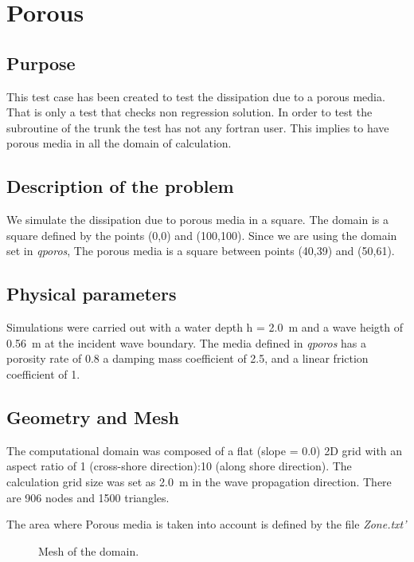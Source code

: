 \chapter{Porous}
%
%
\section{Purpose}
%
This test case has been created to test the dissipation due to a porous media.
That is only a test that checks non regression solution. In order to test the
subroutine of the trunk the test has not any fortran user. This implies to have
porous media in all the domain of calculation.  


%
\section{Description of the problem}
%
We simulate the dissipation due to porous media in a square. The domain is a
square defined by the points (0,0) and (100,100). Since we are using the domain
set in {\it qporos}, The porous media is a square between points (40,39) and
(50,61).  


\section{Physical parameters}
Simulations were carried out with a water depth h = 2.0~m and a wave heigth of
0.56~m at the incident wave boundary. The media defined in {\it qporos} has a
porosity rate of 0.8 a damping mass coefficient  of 2.5, and a linear friction
coefficient of 1.

\section{Geometry and Mesh}
The computational domain was composed of a flat (slope = 0.0) 2D grid with an
aspect ratio of 1 (cross-shore direction):10 (along shore direction).
The calculation grid size was set as 2.0~m in the wave propagation direction.
There are 906 nodes and 1500 triangles.

The area where Porous media is taken into account is defined by the file
{\it Zone.txt'}

\begin{figure} [!h]
\centering
{}
 \caption{Mesh of the domain.}
\label{meshPorous}
\end{figure}
%
